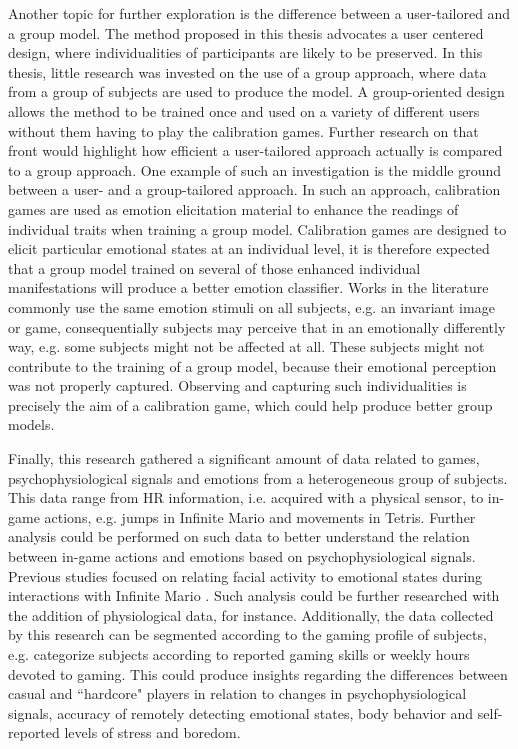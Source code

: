 Another topic for further exploration is the difference between a user-tailored and a group model. The method proposed in this thesis advocates a user centered design, where individualities of participants are likely to be preserved. In this thesis, little research was invested on the use of a group approach, where data from a group of subjects are used to produce the model. A group-oriented design allows the method to be trained once and used on a variety of different users without them having to play the calibration games. Further research on that front would highlight how efficient a user-tailored approach actually is compared to a group approach. One example of such an investigation is the middle ground between a user- and a group-tailored approach. In such an approach, calibration games are used as emotion elicitation material to enhance the readings of individual traits when training a group model. Calibration games are designed to elicit particular emotional states at an individual level, it is therefore expected that a group model trained on several of those enhanced individual manifestations will produce a better emotion classifier. Works in the literature commonly use the same emotion stimuli on all subjects, e.g. an invariant image or game, consequentially subjects may perceive that in an emotionally differently way, e.g. some subjects might not be affected at all. These subjects might not contribute to the training of a group model, because their emotional perception was not properly captured. Observing and capturing such individualities is precisely the aim of a calibration game, which could help produce better group models.

Finally, this research gathered a significant amount of data related to games, psychophysiological signals and emotions from a heterogeneous group of subjects. This data range from HR information, i.e. acquired with a physical sensor, to in-game actions, e.g. jumps in Infinite Mario and movements in Tetris. Further analysis could be performed on such data to better understand the relation between in-game actions and emotions based on psychophysiological signals. Previous studies focused on relating facial activity to emotional states during interactions with Infinite Mario \parencite{shaker2011feature}. Such analysis could be further researched with the addition of physiological data, for instance. Additionally, the data collected by this research can be segmented according to the gaming profile of subjects, e.g. categorize subjects according to reported gaming skills or weekly hours devoted to gaming. This could produce insights regarding the differences between casual and ``hardcore" players in relation to changes in psychophysiological signals, accuracy of remotely detecting emotional states, body behavior and self-reported levels of stress and boredom.

